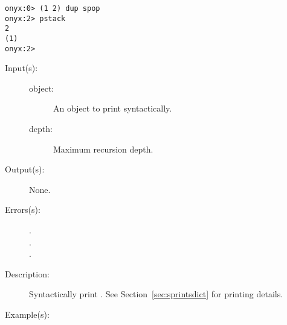 \begin{description}
\begin{description}
\begin{verbatim}
onyx:0> (1 2) dup spop
onyx:2> pstack
2
(1)
onyx:2>
		\end{verbatim}
	\end{description}
\label{systemdict:sprint}
\item[{\onyxop{object depth}{sprint}{--}}: ]
	\begin{description}\item[]
	\item[Input(s): ]
		\begin{description}\item[]
		\item[object: ]
			An object to print syntactically.
		\item[depth: ]
			Maximum recursion depth.
		\end{description}
	\item[Output(s): ] None.
	\item[Errors(s): ]
		\begin{description}\item[]
		\item[.]
		\item[.]
		\item[.]
		\end{description}
	\item[Description: ]
		Syntactically print .  See
		Section~\ref{sec:sprintsdict} for printing details.
	\item[Example(s): ]\begin{verbatim}


\end{verbatim}
\end{description}
\end{description}
